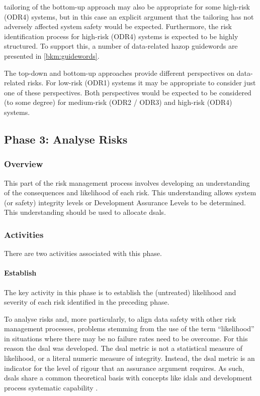 \Gls{tailoring} of the bottom-up approach may also be appropriate for some high-risk (ODR4) systems, but in this case an explicit argument that the \gls{tailoring} has not adversely affected system safety would be expected. Furthermore, the risk identification process for high-risk (ODR4) systems is expected to be highly structured. To support this, a number of data-related \gls{hazop} guidewords are presented in \autoref{bkm:guidewords}.

The top-down and bottom-up approaches provide different perspectives on data-related risks. For low-risk (ODR1) systems it may be appropriate to consider just one of these perspectives. Both perspectives would be expected to be considered (to some degree) for medium-risk (ODR2 / ODR3) and high-risk (ODR4) systems.

\subsection{Phase 3: Analyse Risks}
\subsubsection{Overview}
This part of the risk management process involves developing an understanding of the consequences and likelihood of each risk. This understanding allows system (or safety) \gls{integrity} levels or Development Assurance Levels to be determined. This understanding should be used to allocate
\glspl{dsal}.
%
%
\subsubsection{Activities}
There are two activities associated with this phase.
%
\paragraph{Establish }
\label{bkm:DSAL-table-section}
The key activity in this phase is to establish the (untreated) likelihood and severity of each risk identified in the preceding phase.

To analyse risks and, more particularly, to align data safety with other risk management processes, problems stemming from the use of the term ``likelihood'' in situations where there may be no failure rates need to be overcome. For this reason the \gls{dsal} was developed. The \gls{dsal} metric is not a statistical measure of likelihood, or a literal numeric measure of \gls{integrity}. Instead, the \gls{dsal} metric is an indicator for the level of rigour that an assurance argument requires. As such, \glspl{dsal} share a common theoretical basis with concepts like \glspl{idal}  \cite{citation:arp4754a2010guidelines} and development process systematic capability \cite{citation:iec615083}.

